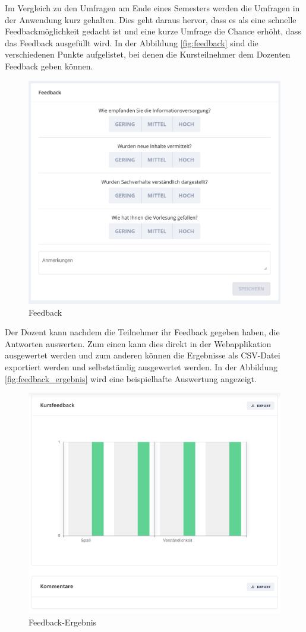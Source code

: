 Im Vergleich zu den Umfragen am Ende eines Semesters werden die Umfragen in der Anwendung kurz gehalten.
Dies geht daraus hervor, dass es als eine schnelle Feedbackmöglichkeit gedacht ist und eine kurze Umfrage die Chance erhöht, dass das Feedback ausgefüllt wird.
In der Abbildung \autoref{fig:feedback} sind die verschiedenen Punkte aufgelistet, bei denen die Kursteilnehmer dem Dozenten Feedback geben können.
\begin{figure}[!h] 
    \centering
    \includegraphics[width=.7\textwidth]{img/Feedback_geben.png}
    \caption{Feedback}
    \label{fig:feedback}
\end{figure}
Der Dozent kann nachdem die Teilnehmer ihr Feedback gegeben haben, die Antworten auswerten. Zum einen kann dies direkt in der Webapplikation ausgewertet werden 
und zum anderen können die Ergebnisse als CSV-Datei exportiert werden und selbstständig ausgewertet werden. In der Abbildung \autoref{fig:feedback_ergebnis} 
wird eine beispielhafte Auswertung angezeigt.
\begin{figure}[!h] 
    \centering
    \includegraphics[width=.7\textwidth]{img/Feedback_uebersicht_Teilnehmer_Feedback.png}
    \caption{Feedback-Ergebnis}
    \label{fig:feedback_ergebnis}
\end{figure}
